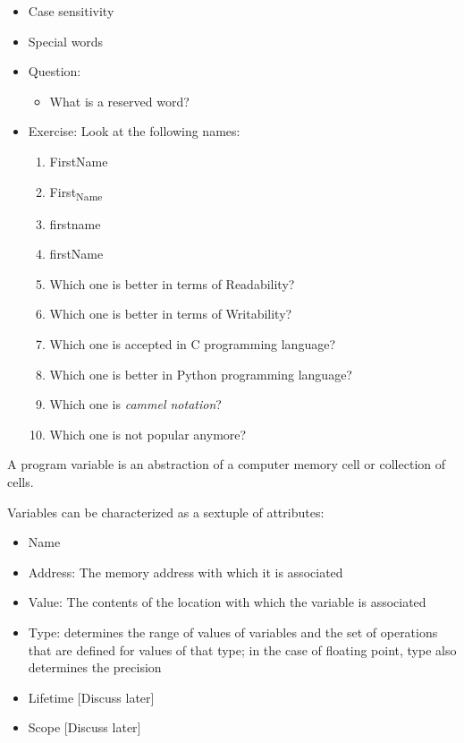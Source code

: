 \documentclass[11pt]{article}
\begin{document}
\begin{itemize}
\item Case sensitivity
\item Special words

\item Question:
\begin{itemize}
\item What is a reserved word?
\end{itemize}

\item Exercise: Look at the following names:

\begin{enumerate}
\item FirstName

\item First\textsubscript{Name}

\item firstname

\item firstName

\item Which one is better in terms of Readability?

\item Which one is better in terms of Writability?

\item Which one is accepted in C programming language?

\item Which one is better in Python programming language?

\item Which one is \emph{cammel notation}?

\item Which one is not popular anymore?
\end{enumerate}
\end{itemize}


A program variable is an abstraction of a computer memory cell or collection
of cells.

Variables can be characterized as a sextuple of attributes:

\begin{itemize}
\item Name

\item Address: The memory address with which it is associated

\item Value: The contents of the location with which the variable is associated

\item Type: determines the range of values of variables and the set of operations
that are defined for values of that type; in the case of floating point, type
also determines the precision

\item Lifetime [Discuss later]

\item Scope [Discuss later]
\end{itemize}
\end{document}
